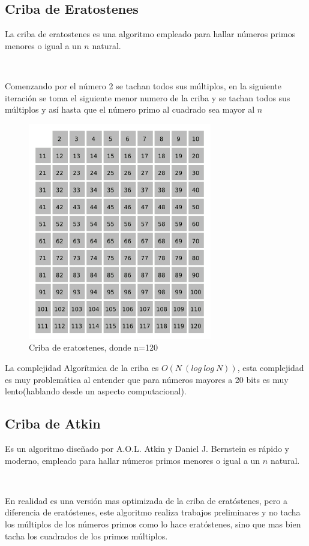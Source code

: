 \documentclass[11pt, conference]{IEEEtran}
\begin{document}
\subsection{Criba de Eratostenes}
La criba de eratostenes es una algoritmo empleado para hallar números primos menores o igual a un $n$ natural. \cite{e}

\

Comenzando por el número 2 se tachan todos sus múltiplos, en la siguiente iteración se toma el siguiente menor numero de la criba y se tachan todos sus múltiplos y así hasta que el número primo al cuadrado sea mayor al $n$

\begin{figure}[h]
	\begin{center}
		\includegraphics[scale=0.5]{5.png}
		\caption{Criba de eratostenes, donde n=120} 
	\end{center}
\end{figure}

La complejidad Algorítmica de la criba es $O(N\ (log\ log\ N))$, esta complejidad es muy problemática al entender que para números mayores a 20 bits es muy lento(hablando desde un aspecto computacional).

\subsection{Criba de Atkin}
Es un algoritmo diseñado por A.O.L. Atkin y Daniel J. Bernstein es rápido y moderno, empleado para hallar números primos menores o igual a un $n$ natural. 

\

En realidad es una versión mas optimizada de la criba de eratóstenes, pero a diferencia de eratóstenes, este algoritmo realiza trabajos preliminares y no tacha los múltiplos de los números primos como lo hace eratóstenes, sino que mas bien tacha los cuadrados de los primos múltiplos.
\end{document}
